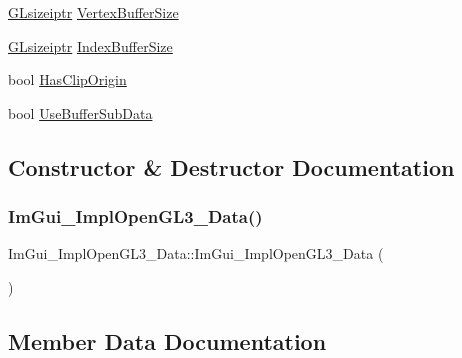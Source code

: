 \begin{DoxyCompactItemize}
\item 
\hyperlink{imgui__impl__opengl3__loader_8h_a45f630b0dfee935f0aed0010167cddb5}{G\+Lsizeiptr} \hyperlink{structImGui__ImplOpenGL3__Data_a8f348c0ed41f34ec5ca6032537526491}{Vertex\+Buffer\+Size}
\item 
\hyperlink{imgui__impl__opengl3__loader_8h_a45f630b0dfee935f0aed0010167cddb5}{G\+Lsizeiptr} \hyperlink{structImGui__ImplOpenGL3__Data_a4fff755aff6cc130aab106a8b20e3041}{Index\+Buffer\+Size}
\item 
bool \hyperlink{structImGui__ImplOpenGL3__Data_a2778e5caad83bc7b69981c53d5e9ed5e}{Has\+Clip\+Origin}
\item 
bool \hyperlink{structImGui__ImplOpenGL3__Data_a7e52bd10bd4d2688df2fbdc915f0e075}{Use\+Buffer\+Sub\+Data}
\end{DoxyCompactItemize}


\subsection{Constructor \& Destructor Documentation}
\mbox{\label{structImGui__ImplOpenGL3__Data_a6bc713060002e1ac64f1daa7b7cecb59}} 
\subsubsection{\texorpdfstring{Im\+Gui\+\_\+\+Impl\+Open\+G\+L3\+\_\+\+Data()}{ImGui\_ImplOpenGL3\_Data()}}
{\footnotesize\ttfamily Im\+Gui\+\_\+\+Impl\+Open\+G\+L3\+\_\+\+Data\+::\+Im\+Gui\+\_\+\+Impl\+Open\+G\+L3\+\_\+\+Data (\begin{DoxyParamCaption}{ }\end{DoxyParamCaption})\hspace{0.3cm}{\ttfamily [inline]}}



\subsection{Member Data Documentation}
\mbox{\label{structImGui__ImplOpenGL3__Data_a0fe508e011d4b62e6a27883c1fc0b19a}} 
